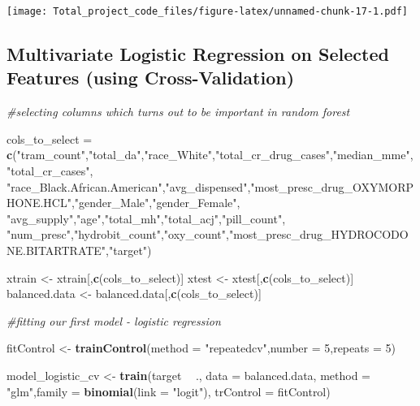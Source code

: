 \documentclass[]{article}
\newenvironment{Shaded}{\begin{snugshade}}{\end{snugshade}}
\newcommand{\KeywordTok}[1]{\textcolor[rgb]{0.13,0.29,0.53}{\textbf{#1}}}
\newcommand{\DataTypeTok}[1]{\textcolor[rgb]{0.13,0.29,0.53}{#1}}
\newcommand{\DecValTok}[1]{\textcolor[rgb]{0.00,0.00,0.81}{#1}}
\newcommand{\StringTok}[1]{\textcolor[rgb]{0.31,0.60,0.02}{#1}}
\newcommand{\CommentTok}[1]{\textcolor[rgb]{0.56,0.35,0.01}{\textit{#1}}}
\newcommand{\OperatorTok}[1]{\textcolor[rgb]{0.81,0.36,0.00}{\textbf{#1}}}
\newcommand{\NormalTok}[1]{#1}
\begin{document}
\texttt{[image: Total\_project\_code\_files/figure-latex/unnamed-chunk-17-1.pdf]}

\subsection{Multivariate Logistic Regression on Selected Features (using
Cross-Validation)}\label{multivariate-logistic-regression-on-selected-features-using-cross-validation}

\begin{Shaded}
\begin{Highlighting}[]
\CommentTok{#selecting columns which turns out to be important in random forest}

\NormalTok{cols_to_select =}\StringTok{ }\KeywordTok{c}\NormalTok{(}\StringTok{"tram_count"}\NormalTok{,}\StringTok{"total_da"}\NormalTok{,}\StringTok{"race_White"}\NormalTok{,}\StringTok{"total_cr_drug_cases"}\NormalTok{,}\StringTok{"median_mme"}\NormalTok{,}\StringTok{"total_cr_cases"}\NormalTok{,}
                   \StringTok{"race_Black.African.American"}\NormalTok{,}\StringTok{"avg_dispensed"}\NormalTok{,}\StringTok{"most_presc_drug_OXYMORPHONE.HCL"}\NormalTok{,}\StringTok{"gender_Male"}\NormalTok{,}\StringTok{"gender_Female"}\NormalTok{,}
                   \StringTok{"avg_supply"}\NormalTok{,}\StringTok{"age"}\NormalTok{,}\StringTok{"total_mh"}\NormalTok{,}\StringTok{"total_acj"}\NormalTok{,}\StringTok{"pill_count"}\NormalTok{,}
                   \StringTok{"num_presc"}\NormalTok{,}\StringTok{"hydrobit_count"}\NormalTok{,}\StringTok{"oxy_count"}\NormalTok{,}\StringTok{"most_presc_drug_HYDROCODONE.BITARTRATE"}\NormalTok{,}\StringTok{"target"}\NormalTok{)}

\NormalTok{xtrain <-}\StringTok{ }\NormalTok{xtrain[,}\KeywordTok{c}\NormalTok{(cols_to_select)]}
\NormalTok{xtest <-}\StringTok{ }\NormalTok{xtest[,}\KeywordTok{c}\NormalTok{(cols_to_select)]}
\NormalTok{balanced.data <-}\StringTok{ }\NormalTok{balanced.data[,}\KeywordTok{c}\NormalTok{(cols_to_select)]}

\CommentTok{#fitting our first model - logistic regression }

\NormalTok{fitControl <-}\StringTok{ }\KeywordTok{trainControl}\NormalTok{(}\DataTypeTok{method =} \StringTok{"repeatedcv"}\NormalTok{,}\DataTypeTok{number =} \DecValTok{5}\NormalTok{,}\DataTypeTok{repeats =} \DecValTok{5}\NormalTok{)}

\NormalTok{model_logistic_cv <-}\StringTok{ }\KeywordTok{train}\NormalTok{(target }\OperatorTok{~}\StringTok{ }\NormalTok{., }\DataTypeTok{data =}\NormalTok{ balanced.data, }\DataTypeTok{method =} \StringTok{"glm"}\NormalTok{,}\DataTypeTok{family =} \KeywordTok{binomial}\NormalTok{(}\DataTypeTok{link =} \StringTok{"logit"}\NormalTok{),}
                          \DataTypeTok{trControl =}\NormalTok{ fitControl)}



\end{Highlighting}
\end{Shaded}
\end{document}
